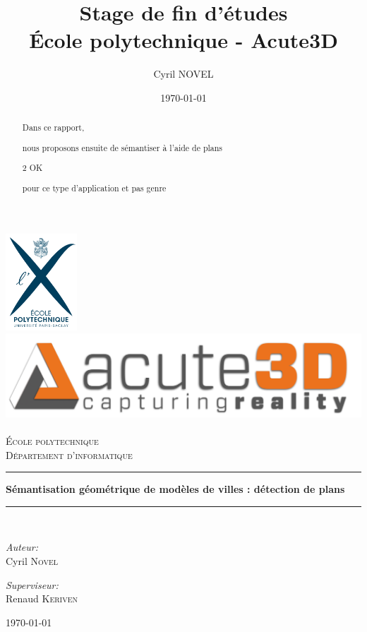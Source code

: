 ﻿\documentclass[12pt, twoside]{article}
\title{Stage de fin d'études\\
\large{École polytechnique - Acute3D}}
\author{Cyril NOVEL}
\date{\today}
\begin{document}
\begin{titlepage}
\begin{center}
\includegraphics[width=0.20\textwidth]{LogoX.jpg}~\\[0.5cm]
\includegraphics[height=0.12\textwidth]{LogoA3D.jpg}~\\[1cm]

\textsc{\LARGE École polytechnique}\\[0.5cm]

\textsc{\Large Département d'informatique}\\[1.5cm]

\rule{\textwidth}{.4pt}
{ \huge \bfseries Sémantisation géométrique de modèles de villes : détection de plans \\[0.4cm] }

\rule{\textwidth}{.4pt}\\[1.5cm]

\begin{minipage}{0.4\textwidth}
\begin{flushleft} \large
\emph{Auteur:}\\
Cyril \textsc{Novel}
\end{flushleft}
\end{minipage}
\begin{minipage}{0.4\textwidth}
\begin{flushright} \large
\emph{Superviseur:} \\
Renaud \textsc{Keriven}
\end{flushright}
\end{minipage}

\vfill
{\large \today}
\end{center}
\end{titlepage}

\newpage
\begin{abstract}
Dans ce rapport,

nous proposons ensuite de sémantiser à l'aide de plans

2 OK

pour ce type d'application et pas genre

\end{abstract}~\\[5cm]
\end{document}
